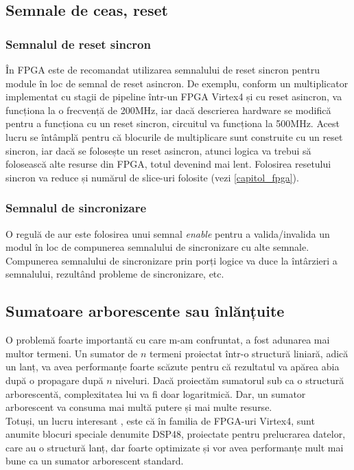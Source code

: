 \documentclass[12pt,twoside,a4paper,fleqn]{book}
\theoremstyle{definition}
\begin{document}
\subsection{Semnale de ceas, reset}
\subsubsection{Semnalul de reset sincron}
În FPGA este de recomandat utilizarea semnalului de reset sincron pentru module în loc de semnal de reset asincron. De exemplu, conform \cite{xilinx_coding_practices} un multiplicator implementat cu stagii de pipeline într-un FPGA Virtex4 și cu reset asincron, va funcționa la o frecvență de 200MHz, iar dacă descrierea hardware se modifică pentru a funcționa cu un reset sincron, circuitul va funcționa la 500MHz. Acest lucru se întâmplă pentru că blocurile de multiplicare sunt construite cu un reset sincron, iar dacă se folosește un reset asincron, atunci logica va trebui să folosească alte resurse din FPGA, totul devenind mai lent. Folosirea resetului sincron va reduce și numărul de slice-uri folosite (vezi \ref{capitol_fpga}).

\subsubsection{Semnalul de sincronizare}
O regulă de aur este folosirea unui semnal \emph{enable} pentru a valida/invalida un modul în loc de compunerea semnalului de sincronizare cu alte semnale. Compunerea semnalului de sincronizare prin porți logice va duce la întârzieri a semnalului, rezultând probleme de sincronizare, etc.


\subsection{Sumatoare arborescente sau înlănțuite}
O problemă foarte importantă cu care m-am confruntat, a fost adunarea mai multor termeni. Un sumator de $n$ termeni proiectat într-o structură liniară, adică un lanț, va avea performanțe foarte scăzute pentru că rezultatul va apărea abia după o propagare după $n$ niveluri. Dacă proiectăm sumatorul sub ca o structură arborescentă, complexitatea lui va fi doar logaritmică. Dar, un sumator arborescent va consuma mai multă putere și mai multe resurse.\\
Totuși, un lucru interesant \cite{xilinx_coding_practices}, este că în familia de FPGA-uri Virtex4, sunt anumite blocuri speciale denumite DSP48, proiectate pentru prelucrarea datelor, care au o structură lanț, dar foarte optimizate și vor avea performanțe mult mai bune ca un sumator arborescent standard.
\end{document}
